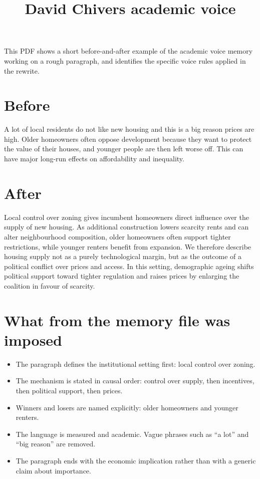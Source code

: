 \documentclass[11pt]{article}
\title{David Chivers academic voice}
\date{}
\begin{document}
\maketitle

This PDF shows a short before-and-after example of the academic voice memory working on a rough paragraph, and identifies the specific voice rules applied in the rewrite.

\section*{Before}

A lot of local residents do not like new housing and this is a big reason prices are high. Older homeowners often oppose development because they want to protect the value of their houses, and younger people are then left worse off. This can have major long-run effects on affordability and inequality.

\section*{After}

Local control over zoning gives incumbent homeowners direct influence over the supply of new housing. As additional construction lowers scarcity rents and can alter neighbourhood composition, older homeowners often support tighter restrictions, while younger renters benefit from expansion. We therefore describe housing supply not as a purely technological margin, but as the outcome of a political conflict over prices and access. In this setting, demographic ageing shifts political support toward tighter regulation and raises prices by enlarging the coalition in favour of scarcity.

\section*{What from the memory file was imposed}

\begin{itemize}
\item The paragraph defines the institutional setting first: local control over zoning.
\item The mechanism is stated in causal order: control over supply, then incentives, then political support, then prices.
\item Winners and losers are named explicitly: older homeowners and younger renters.
\item The language is measured and academic. Vague phrases such as ``a lot'' and ``big reason'' are removed.
\item The paragraph ends with the economic implication rather than with a generic claim about importance.
\end{itemize}
\end{document}
